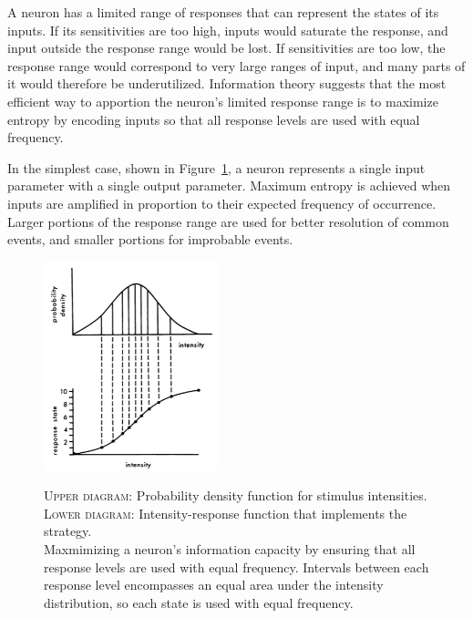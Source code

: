 \documentclass[twoside]{article}
\begin{document}
\begin{multicols}{2}
A neuron has a limited range of responses that can represent the states of its inputs. If its sensitivities are too high, inputs would saturate the response, and input outside the response range would be lost. If sensitivities are too low, the response range would correspond to very large ranges of input, and many parts of it would therefore be underutilized. Information theory suggests that the most efficient way to apportion the neuron's limited response range is to maximize entropy by encoding inputs so that all response levels are used with equal frequency. 

In the simplest case, shown in Figure~\ref{fig:laughlin1981-fig1}, a neuron represents a single input parameter with a single output parameter. Maximum entropy is achieved when inputs are amplified in proportion to their expected frequency of occurrence. Larger portions of the response range are used for better resolution of common events, and smaller portions for improbable events. 

\begin{figure}[H]
	\caption{
		\textsc{Upper diagram:} Probability density function for stimulus intensities. \\ \textsc{Lower diagram:} Intensity-response function that implements the strategy. \\ Maxmimizing a neuron's information capacity by ensuring that all response levels are used with equal frequency. Intervals between each response level encompasses an equal area under the intensity distribution, so each state is used with equal frequency.
	}
	\includegraphics[width=0.45\textwidth]{laughlin1981-fig1}
	\label{fig:laughlin1981-fig1}
\end{figure}


\end{multicols}
\end{document}
